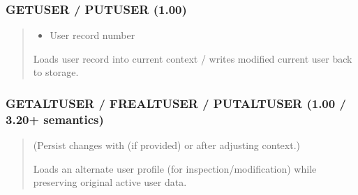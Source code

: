 \documentclass[letterpaper,10pt,english]{sphinxmanual}
\begin{document}
\subsubsection{GETUSER / PUTUSER (1.00)}
\label{\detokenize{ppl:getuser-putuser-1-00}}\begin{quote}

\sphinxAtStartPar
{}
\begin{description}
\begin{itemize}
\item {} 
\sphinxAtStartPar
{} \textendash{} User record number

\end{itemize}

\sphinxAtStartPar
Loads user record into current context / writes modified current user back to storage.

\end{description}
\end{quote}


\subsubsection{GETALTUSER / FREALTUSER / PUTALTUSER (1.00 / 3.20+ semantics)}
\label{\detokenize{ppl:getaltuser-frealtuser-putaltuser-1-00-3-20-semantics}}\begin{quote}

\sphinxAtStartPar
{}
(Persist changes with  (if provided) or  after adjusting context.)
\begin{description}
\sphinxAtStartPar
Loads an alternate user profile (for inspection/modification) while preserving original active user data.

\end{description}
\end{quote}
\end{document}
